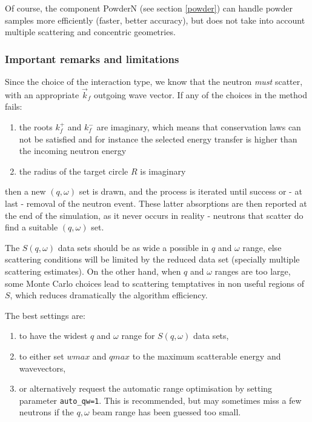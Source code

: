 Of course, the component PowderN (see section \ref{powder}) can handle powder samples more efficiently (faster, better accuracy), but does not take into account multiple scattering and concentric geometries.

\subsubsection{Important remarks and limitations}

Since the choice of the interaction type, we know that the neutron \emph{must} scatter, with an appropriate $\vec k_f$ outgoing wave vector. If any of the choices in the method fails:
\begin{enumerate}
\item the roots $k_f^+$ and $k_f^-$ are imaginary, which means that conservation laws can not be satisfied and for instance the selected energy transfer is higher than the incoming neutron energy
\item the radius of the target circle $R$ is imaginary
\end{enumerate}
then a new $(q, \omega)$ set is drawn, and the process is iterated until success or - at last - removal of the neutron event. These latter absorptions are then reported at the end of the simulation, as it never occurs in reality - neutrons that scatter do find a suitable $(q, \omega)$ set.

The $S(q,\omega)$ data sets should be as wide a possible in $q$ and $\omega$ range, else scattering conditions will be limited by the reduced data set (specially multiple scattering estimates). On the other hand, when $q$ and $\omega$ ranges are too large, some Monte Carlo choices lead to scattering temptatives in non useful regions of $S$, which reduces dramatically the algorithm efficiency.

The best settings are:
\begin{enumerate}
\item to have the widest $q$ and $\omega$ range for $S(q,\omega)$ data sets,
\item to either set $wmax$ and $qmax$ to the maximum scatterable energy and wavevectors,
\item or alternatively request the automatic range optimisation by setting parameter \verb+auto_qw=1+. This is recommended, but may sometimes miss a few neutrons if the $q,\omega$ beam range has been guessed too small.
\end{enumerate}

